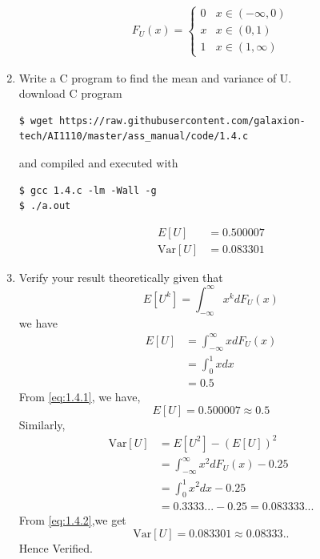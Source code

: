 \documentclass[journal,12pt,twocolumn]{IEEEtran}
\renewcommand\thesection{\arabic{section}}
\begin{document}
\begin{enumerate}[label=\thesection.\arabic*.,ref=\thesection.\theenumi]
    \begin{align}
    F_U(x) =  \begin{cases}
        0 & x \in (-\infty,0)\\
        x & x \in (0,1) \\
        1 & x \in (1,\infty)
    \end{cases} 
    \end{align}


\item Write a C program to find the mean and variance of U.\\

\solution download C program

\begin{lstlisting}
$ wget https://raw.githubusercontent.com/galaxion-tech/AI1110/master/ass_manual/code/1.4.c
        \end{lstlisting}
        and compiled and executed with
        \begin{lstlisting}
$ gcc 1.4.c -lm -Wall -g
$ ./a.out
        \end{lstlisting}
    \begin{align}
        E[U] &= 0.500007  \label{eq:1.4.1}\\
        \text{Var}[U] &= 0.083301 \label{eq:1.4.2}
    \end{align}
\item Verify your result theoretically given that 
    \begin{equation}
        E[U^k] = \int_{- \infty}^{\infty} x^k dF_U(x)
    \end{equation}
    \solution we have 
    \begin{align}
        E[U] &= \int_{-\infty}^{\infty} xdF_U(x) \\
        &= \int_{0}^1 x dx \\
        &=  0.5
    \end{align}
    From \eqref{eq:1.4.1}, we have, 
    \begin{equation}
        E[U] = 0.500007 \approx 0.5
    \end{equation}
    Similarly,
    \begin{align}
        \text{Var}[U]&=E[U^2]-(E[U])^2 \\
        &=\int_{-\infty}^{\infty}x^2dF_U(x) - 0.25\\
        &=\int_{0}^{1}x^2dx - 0.25\\
        &=0.3333...-0.25=0.083333...
    \end{align}
    From \eqref{eq:1.4.2},we get
    \begin{equation}
        \text{Var}[U] = 0.083301 \approx 0.08333..
    \end{equation}
    Hence Verified.
\end{enumerate}
\end{document}
